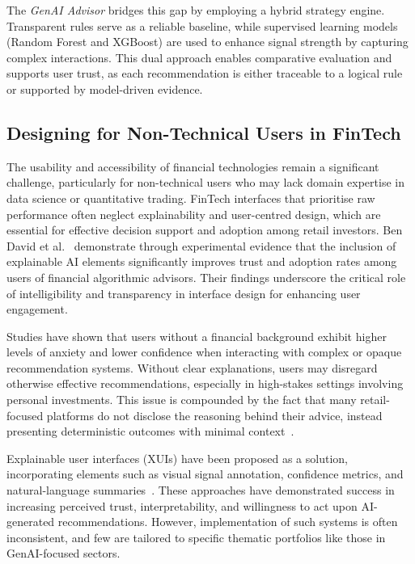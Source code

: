 The \textit{GenAI Advisor} bridges this gap by employing a hybrid strategy engine. Transparent rules serve as a reliable baseline, while supervised learning models (Random Forest and XGBoost) are used to enhance signal strength by capturing complex interactions. This dual approach enables comparative evaluation and supports user trust, as each recommendation is either traceable to a logical rule or supported by model-driven evidence.

\subsection{Designing for Non-Technical Users in FinTech}

The usability and accessibility of financial technologies remain a significant challenge, particularly for non-technical users who may lack domain expertise in data science or quantitative trading. FinTech interfaces that prioritise raw performance often neglect explainability and user-centred design, which are essential for effective decision support and adoption among retail investors. Ben David et al.~\cite{bendavid2021explainable} demonstrate through experimental evidence that the inclusion of explainable AI elements significantly improves trust and adoption rates among users of financial algorithmic advisors. Their findings underscore the critical role of intelligibility and transparency in interface design for enhancing user engagement.

Studies have shown that users without a financial background exhibit higher levels of anxiety and lower confidence when interacting with complex or opaque recommendation systems. Without clear explanations, users may disregard otherwise effective recommendations, especially in high-stakes settings involving personal investments. This issue is compounded by the fact that many retail-focused platforms do not disclose the reasoning behind their advice, instead presenting deterministic outcomes with minimal context~\cite{zarifis2024trust}.

Explainable user interfaces (XUIs) have been proposed as a solution, incorporating elements such as visual signal annotation, confidence metrics, and natural-language summaries~\cite{bendavid2021explainable}. These approaches have demonstrated success in increasing perceived trust, interpretability, and willingness to act upon AI-generated recommendations. However, implementation of such systems is often inconsistent, and few are tailored to specific thematic portfolios like those in GenAI-focused sectors.

